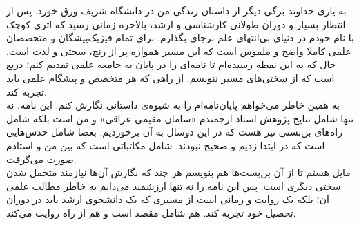 به یاری خداوند برگی دیگر از داستان زندگی من در دانشگاه شریف ورق خورد. پس از انتظار بسیار و دوران طولانی کارشناسی و ارشد، بالاخره زمانی رسید که اثری کوچک با نام خودم در دنیای بی‌انتهای علم برجای بگذارم. برای تمام فیزیک‌پیشگان و متخصصان علمی کاملا واضح و ملموس است که این مسیر همواره پر از رنج، سختی و لذت است. حال که به این نقطه رسیده‌ام تا نامه‌ای را در پایان به جامعه علمی تقدیم کنم؛ دریغ است که از سختی‌های مسیر ننویسم. از راهی که هر متخصص و پیشگام علمی باید تجربه کند.\\

به همین خاطر می‌خواهم پایان‌نامه‌ام را به شیوه‌ی داستانی نگارش کنم. این نامه، نه تنها شامل نتایج پژوهش استاد ارجمندم «سامان مقیمی عراقی»  و من است بلکه شامل راه‌های بن‌بستی نیز هست که در این دوسال به آن برخوردیم. بعضا شامل حدس‌هایی است که در ابتدا زدیم و صحیح نبودند. شامل مکاتباتی است که بین من و استادم صورت می‌گرفت.\\

مایل هستم تا از آن بن‌بست‌ها هم بنویسم هر چند که نگارش آن‌ها نیازمند متحمل شدن سختی دیگری است. پس این نامه را نه تنها ارزشمند می‌دانم به خاطر مطالب علمی آن؛ بلکه یک روایت و رمانی است از مسیری که یک دانشجوی ارشد باید در دوران تحصیل خود تجربه کند. هم شامل مقصد است و هم از راه روایت می‌کند.